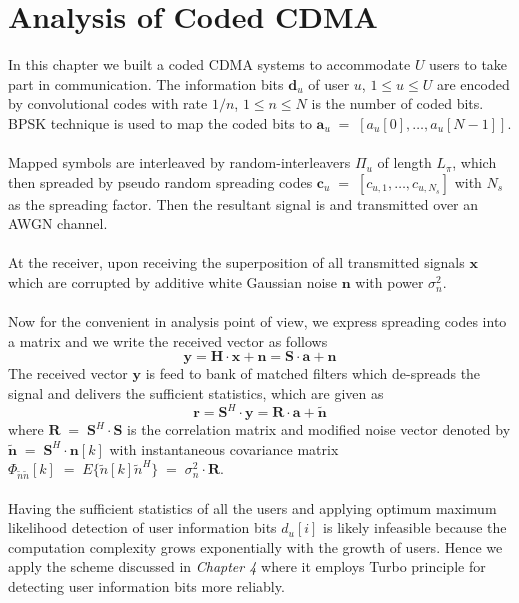\chapter{Analysis of Coded CDMA}
In this chapter we built a coded CDMA systems to accommodate $U$ users to take part in communication. The information bits $\mathrm{\mathbf{d}}_u$ of user $u$, $1\leq u \leq U$ are encoded by convolutional codes with rate $1/n$, $1\leq n \leq N$ is the number of coded bits. BPSK technique is used to map the coded bits to $\mathrm{\mathbf{a}}_u\;=\;\left[a_u[0],\dots,a_u[N-1]\right]$.\\ \\
Mapped symbols are interleaved by random-interleavers $\Pi_u$ of length $L_\pi$, which then spreaded by pseudo random spreading codes $\mathrm{\mathbf{c}}_u\;=\;\left[c_{u,1},\dots,c_{u,N_s}\right]$ with $N_s$ as the spreading factor. Then the resultant signal is and transmitted over an AWGN channel.\\ \\
At the receiver, upon receiving the superposition of all transmitted signals $\mathrm{\mathbf{x}}$ which are corrupted by additive white Gaussian noise $\mathrm{\mathbf{n}}$ with power $\sigma^2_n$. \\ \\
Now for the convenient in analysis point of view, we express spreading codes into a matrix and we write the received vector as follows
\begin{equation}
\mathrm{\mathbf{y}}=\mathrm{\mathbf{H}}\cdot\mathrm{\mathbf{x}}+\mathrm{\mathbf{n}}=\mathrm{\mathbf{S}}\cdot\mathrm{\mathbf{a}}+\mathrm{\mathbf{n}}
\end{equation}
The received vector $\mathrm{\mathbf{y}}$ is feed to bank of matched filters which de-spreads the signal and delivers the sufficient statistics, which are given as
\begin{equation}
\mathrm{\mathbf{r}}=\mathrm{\mathbf{S}}^H\cdot \mathrm{\mathbf{y}}=\mathrm{\mathbf{R}}\cdot\mathrm{\mathbf{a}}+\mathrm{\mathbf{\tilde{n}}}
\end{equation}
where $\mathrm{\mathbf{R}}\;=\;\mathrm{\mathbf{S}}^H\cdot\mathrm{\mathbf{S}}$ is the correlation matrix and modified noise vector denoted by $\mathrm{\mathbf{\tilde{n}}}\;=\;\mathrm{\mathbf{S}}^H\cdot\mathrm{\mathbf{n}}[k]$ with instantaneous covariance matrix $\Phi_{\tilde{n}\tilde{n}}[k]\;=\;E\{\tilde{n}[k]\tilde{n}^H\}\;=\;\sigma^2_n\cdot\mathrm{\mathbf{R}}$.\\ \\
Having the sufficient statistics of all the users and applying optimum maximum likelihood detection of user information bits $d_u[i]$ is likely infeasible because the computation complexity grows exponentially with the growth of users. Hence we apply the scheme discussed in \textit{Chapter 4} where it employs Turbo principle for detecting user information bits more reliably.\\ \\
